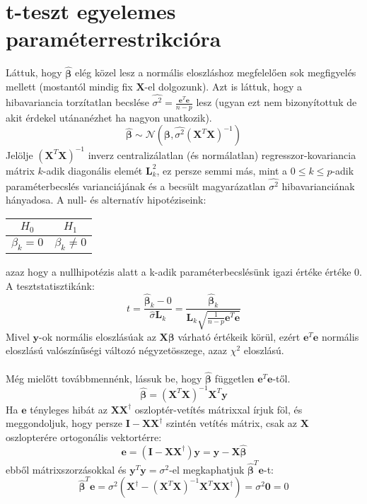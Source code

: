 \documentclass[14p]{report}
\def\pmb{\boldsymbol}
\def\ebeta{\hat{\pmb{\beta}}}
\begin{document}
	\section{t-teszt egyelemes paraméterrestrikcióra}
	Láttuk, hogy $\ebeta$ elég közel lesz a normális eloszláshoz megfelelően sok megfigyelés mellett (mostantól mindig fix $\pmb{X}$-el dolgozunk). Azt is láttuk, hogy a hibavariancia torzítatlan becslése $\widehat{\sigma^2} = \frac{\pmb{e}^T\pmb{e}}{n-p}$ lesz (ugyan ezt nem bizonyítottuk de akit érdekel utánanézhet ha nagyon unatkozik).
	\[
		\ebeta \sim \mathcal{N}(\pmb{\beta}, \widehat{\sigma^2}(\pmb{X}^T\pmb{X})^{-1})
	\]
	Jelölje $(\pmb{X}^T\pmb{X})^{-1}$ inverz centralizálatlan (és normálatlan) regresszor-kovariancia mátrix $k$-adik diagonális elemét $\pmb{L}_{k}^2$, ez persze semmi más, mint a $0 \le k \le p$-adik paraméterbecslés varianciájának és a becsült magyarázatlan $\widehat{\sigma^2}$ hibavarianciának hányadosa. A null- és alternatív hipotéziseink:
	\begin{center}
		\begin{tabular}{|c|c|}
			\hline
			$H_0$ & $H_1$ \\
			\hline
			$\beta_k = 0$ & $\beta_k \ne 0$ \\
			\hline
		\end{tabular}
	\end{center}
	azaz hogy a nullhipotézis alatt a k-adik paraméterbecslésünk igazi értéke értéke $0$. A tesztstatisztikánk:
	\[
		t = \frac{\ebeta_k - 0}{\widehat{\sigma}\pmb{L}_{k}} = \frac{\ebeta_k}{\pmb{L}_k\sqrt{\frac{1}{n-p}\pmb{e}^T\pmb{e}}}
	\]
	Mivel $\pmb{y}$-ok normális eloszlásúak az $\pmb{X}\pmb{\beta}$ várható értékeik körül, ezért $\pmb{e}^T\pmb{e}$ normális eloszlású valószínűségi változó négyzetösszege, azaz $\chi^2$ eloszlású.
	\\
	\\
	Még mielőtt továbbmennénk, lássuk be, hogy $\ebeta$ független $\pmb{e}^T\pmb{e}$-től.
	\[
		\ebeta = (\pmb{X}^T\pmb{X})^{-1}\pmb{X}^T\pmb{y}
	\]
	Ha $\pmb{e}$ tényleges hibát az $\pmb{X}\pmb{X}^{\dagger}$ oszloptér-vetítés mátrixxal írjuk föl, és meggondoljuk, hogy persze $\pmb{I} - \pmb{X}\pmb{X}^{\dagger}$ szintén vetítés mátrix, csak az $\pmb{X}$ oszlopterére ortogonális vektortérre:
	\[
		\pmb{e} = (\pmb{I} - \pmb{X}\pmb{X}^{\dagger})\pmb{y} = \pmb{y} - \pmb{X}\ebeta
	\] 
	ebből mátrixszorzásokkal és $\pmb{y}^T\pmb{y} = \sigma^2$-el megkaphatjuk $\ebeta^T\pmb{e}$-t:
	\[
		\ebeta^T\pmb{e} = \sigma^2(\pmb{X}^{\dagger} - (\pmb{X}^T\pmb{X})^{-1}\pmb{X}^T\pmb{X}\pmb{X}^{\dagger}) = \sigma^2\pmb{0} = 0
	\]
\end{document}
